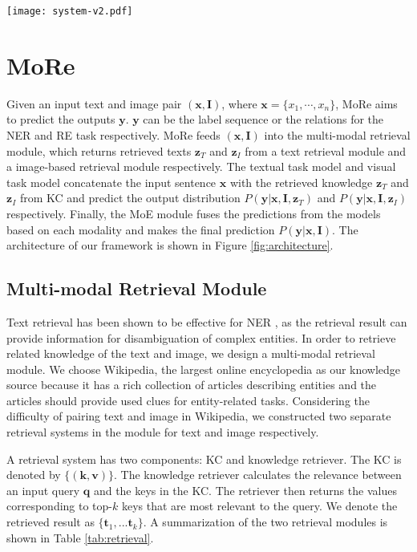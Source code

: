 \documentclass[11pt]{article}
\def\vk{{\bm{k}}}
\def\vq{{\bm{q}}}
\def\vt{{\bm{t}}}
\def\vv{{\bm{v}}}
\def\vx{{\bm{x}}}
\def\vy{{\bm{y}}}
\def\vz{{\bm{z}}}
\def\mI{{\bm{I}}}
\begin{document}
\begin{figure*}[t!]
	\centering
	\texttt{[image: system-v2.pdf]}
	\caption{The architecture of MoRe.}
	\label{fig:architecture}
\end{figure*}


\section{MoRe}
Given an input text and image pair $(\vx,\mI)$, where $\vx = \{x_1, \cdots, x_n\}$, MoRe aims to predict the outputs $\vy$. $\vy$ can be the label sequence or the relations for the NER and RE task respectively. MoRe feeds $(\vx,\mI)$ into the multi-modal retrieval module, which returns retrieved texts $\vz_{T}$ and $\vz_{I}$ from a text retrieval module and a image-based retrieval module respectively. The textual task model and visual task model concatenate the input sentence $\vx$ with the retrieved knowledge $\vz_{T}$ and $\vz_{I}$ from KC 
and predict the output distribution $P(\vy|\vx,\mI,\vz_{T})$ and $P(\vy|\vx,\mI,\vz_{I})$ respectively. Finally, the MoE module fuses the predictions from the models based on each modality and makes the final prediction $P(\vy|\vx,\mI)$. The architecture of our framework is shown in Figure \ref{fig:architecture}. 

\subsection{Multi-modal Retrieval Module}
\label{sec:retr}

Text retrieval has been shown to be effective for NER \cite{wang-etal-2021-improving}, as the retrieval result can provide information for disambiguation of complex entities. In order to retrieve related knowledge of the text and image, we design a multi-modal retrieval module. 
We choose Wikipedia, the largest online encyclopedia as our knowledge source because it has a rich collection of articles describing entities and the articles should provide used clues for entity-related tasks. Considering the difficulty of pairing text and image in Wikipedia, we constructed two separate retrieval systems in the module for text and image respectively. 

A retrieval system has two components: KC and knowledge retriever. The KC is denoted by $\{(\vk, \vv)\}$. The knowledge retriever calculates the relevance between an input query $\vq$ and the keys in the KC. The retriever then returns the values corresponding to top-$k$ keys that are most relevant to the query. We denote the retrieved result as $\{ \vt_1, ... \vt_k \}$. A summarization of the two retrieval modules is shown in Table \ref{tab:retrieval}.
\end{document}
